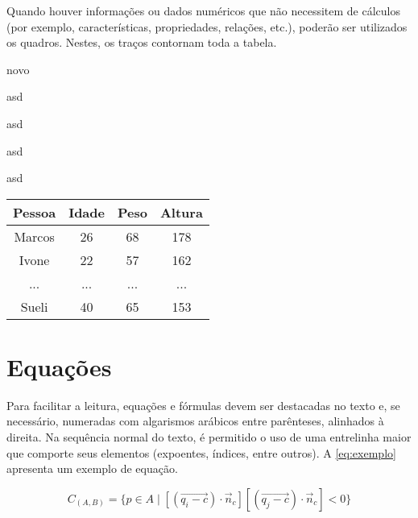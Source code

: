 \documentclass[12pt,oneside,a4paper,chapter=TITLE,section=TITLE,sumario=tradicional]{abntex2}
\begin{document}
Quando houver informações ou dados numéricos que não necessitem de cálculos 
(por exemplo, características, propriedades, relações, etc.), poderão ser 
utilizados os quadros. Nestes, os traços contornam toda a tabela.

\begin{lista}
	\item novo
	\item asd
	\item asd
	\item asd
	\item asd
\end{lista}

\begin{quadro}[htb]
    \begin{tabular}{|c||c|c|c|}
        \hline
        \textbf{Pessoa} & \textbf{Idade} & \textbf{Peso} & \textbf{Altura} \\ 
        \hline\hline
        Marcos & 26    & 68   & 178    \\ \hline
        Ivone  & 22    & 57   & 162    \\ \hline
        ...    & ...   & ...  & ...    \\ \hline
        Sueli  & 40    & 65   & 153    \\ \hline
    \end{tabular}
    
\end{quadro}

\section{Equações}
\label{sec:equações}

Para facilitar a leitura, equações e fórmulas devem ser destacadas no texto e, 
se necessário, numeradas com algarismos arábicos entre parênteses, alinhados à 
direita. Na sequência normal do texto, é permitido o uso de uma entrelinha 
maior que comporte seus elementos (expoentes, índices, entre outros). A 
\autoref{eq:exemplo} apresenta um exemplo de equação.

\begin{equation}
\label{eq:exemplo}
C_{(A,B)} = \{ p \in
A\;|\;[(\overrightarrow{q_i-c}){\cdot}{\vec{n}}_c][(\overrightarrow{q_j-c}){\cdot}{\vec{n}}_c]
< 0 \}
\end{equation}

\end{document}
